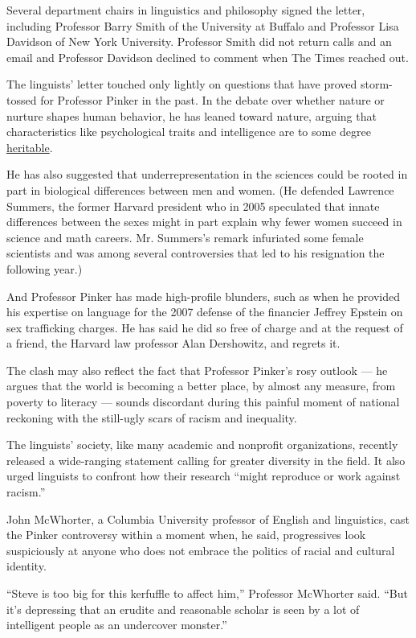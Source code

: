Several department chairs in linguistics and philosophy signed the
letter, including Professor Barry Smith of the University at Buffalo and
Professor Lisa Davidson of New York University. Professor Smith did not
return calls and an email and Professor Davidson declined to comment
when The Times reached out.

The linguists' letter touched only lightly on questions that have proved
storm-tossed for Professor Pinker in the past. In the debate over
whether nature or nurture shapes human behavior, he has leaned toward
nature, arguing that characteristics like psychological traits and
intelligence are to some degree
\href{https://www.nytimes.com/2009/01/11/magazine/11Genome-t.html}{heritable}.

He has also suggested that underrepresentation in the sciences could be
rooted in part in biological differences between men and women. (He
defended Lawrence Summers, the former Harvard president who in 2005
speculated that innate differences between the sexes might in part
explain why fewer women succeed in science and math careers. Mr.
Summers's remark infuriated some female scientists and was among several
controversies that led to his resignation the following year.)

And Professor Pinker has made high-profile blunders, such as when he
provided his expertise on language for the 2007 defense of the financier
Jeffrey Epstein on sex trafficking charges. He has said he did so free
of charge and at the request of a friend, the Harvard law professor Alan
Dershowitz, and regrets it.

The clash may also reflect the fact that Professor Pinker's rosy outlook
--- he argues that the world is becoming a better place, by almost any
measure, from poverty to literacy --- sounds discordant during this
painful moment of national reckoning with the still-ugly scars of racism
and inequality.

The linguists' society, like many academic and nonprofit organizations,
recently released a wide-ranging statement calling for greater diversity
in the field. It also urged linguists to confront how their research
``might reproduce or work against racism.''

John McWhorter, a Columbia University professor of English and
linguistics, cast the Pinker controversy within a moment when, he said,
progressives look suspiciously at anyone who does not embrace the
politics of racial and cultural identity.

``Steve is too big for this kerfuffle to affect him,'' Professor
McWhorter said. ``But it's depressing that an erudite and reasonable
scholar is seen by a lot of intelligent people as an undercover
monster.''

